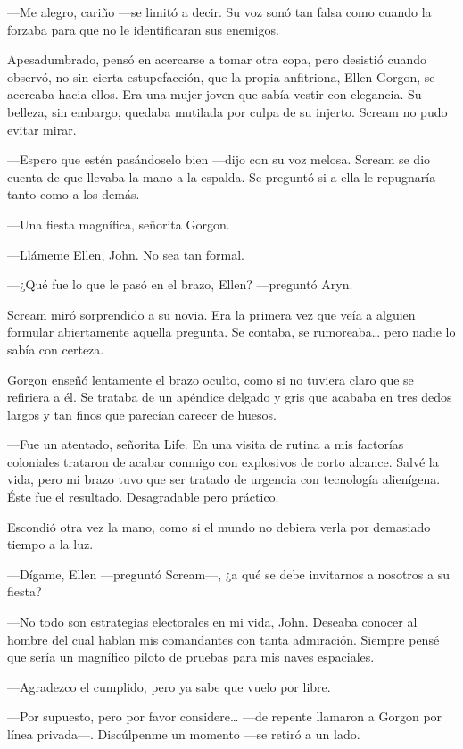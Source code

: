 ---Me alegro, cariño ---se limitó a decir. Su voz sonó tan falsa como cuando la forzaba para que no le identificaran sus enemigos.

Apesadumbrado, pensó en acercarse a tomar otra copa, pero desistió cuando observó, no sin cierta estupefacción, que la propia anfitriona, Ellen Gorgon, se acercaba hacia ellos. Era una mujer joven que sabía vestir con elegancia. Su belleza, sin embargo, quedaba mutilada por culpa de su injerto. Scream no pudo evitar mirar.

---Espero que estén pasándoselo bien ---dijo con su voz melosa. Scream se dio cuenta de que llevaba la mano a la espalda. Se preguntó si a ella le repugnaría tanto como a los demás.

---Una fiesta magnífica, señorita Gorgon.

---Llámeme Ellen, John. No sea tan formal.

---¿Qué fue lo que le pasó en el brazo, Ellen? ---preguntó Aryn.

Scream miró sorprendido a su novia. Era la primera vez que veía a alguien formular abiertamente aquella pregunta. Se contaba, se rumoreaba\dots{} pero nadie lo sabía con certeza.

Gorgon enseñó lentamente el brazo oculto, como si no tuviera claro que se refiriera a él. Se trataba de un apéndice delgado y gris que acababa en tres dedos largos y tan finos que parecían carecer de huesos.

---Fue un atentado, señorita Life. En una visita de rutina a mis factorías coloniales trataron de acabar conmigo con explosivos de corto alcance. Salvé la vida, pero mi brazo tuvo que ser tratado de urgencia con tecnología alienígena. Éste fue el resultado. Desagradable pero práctico.

Escondió otra vez la mano, como si el mundo no debiera verla por demasiado tiempo a la luz.

---Dígame, Ellen ---preguntó Scream---, ¿a qué se debe invitarnos a nosotros a su fiesta?

---No todo son estrategias electorales en mi vida, John. Deseaba conocer al hombre del cual hablan mis comandantes con tanta admiración. Siempre pensé que sería un magnífico piloto de pruebas para mis naves espaciales.

---Agradezco el cumplido, pero ya sabe que vuelo por libre.

---Por supuesto, pero por favor considere\dots{} ---de repente llamaron a Gorgon por línea privada---. Discúlpenme un momento ---se retiró a un lado.

